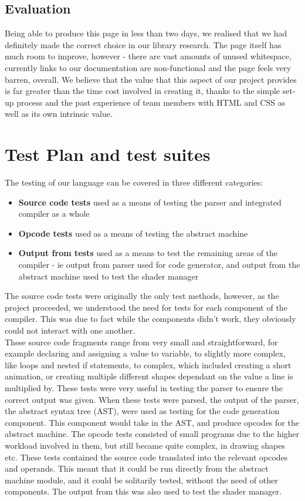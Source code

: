 \documentclass{l3proj}
\begin{document}
\section{Evaluation}
\label{ide-eval}
Being able to produce this page in less than two days, we realised that we had definitely made the correct choice in our library research. The page itself has much room to improve, however - there are vast amounts of unused whitespace, currently links to our documentation are non-functional and the page feels very barren, overall. We believe that the value that this aspect of our project provides is far greater than the time cost involved in creating it, thanks to the simple set-up process and the past experience of team members with HTML and CSS as well as its own intrinsic value.
\chapter{Test Plan and test suites}
\label{test}
The testing of our language can be covered in three different categories:
\begin{itemize}
\item \textbf{Source code tests} used as a means of testing the parser and integrated compiler as a whole
\item \textbf{Opcode tests} used as a means of testing the abstract machine
\item \textbf{Output from tests} used as a means to test the remaining areas of the compiler - ie output from parser used for code generator, and output from the abstract machine used to test the shader manager
\end{itemize}
The source code tests were originally the only test methods, however, as the project proceeded, we understood the need for tests for each component of the compiler. This was due to fact while the components didn't work, they obviously could not interact with one another.
\\[12pt]
These source code fragments range from very small and straightforward, for example declaring and assigning a value to variable, to slightly more complex, like loops and nested if statements, to complex, which included creating a short animation, or creating multiple different shapes dependant on the value a line is multiplied by. These tests were very useful in testing the parser to ensure the correct output was given. When these tests were parsed, the output of the parser, the abstract syntax tree (AST), were used as testing for the code generation component. This component would take in the AST, and produce opcodes for the abstract machine.
The opcode tests consisted of small programs due to the higher workload involved in them, but still became quite complex, in drawing shapes etc. These tests contained the source code translated into the relevant opcodes and operands. This meant that it could be run directly from the abstract machine module, and it could be solitarily tested, without the need of other components. The output from this was also used to test the shader manager.
\end{document}
